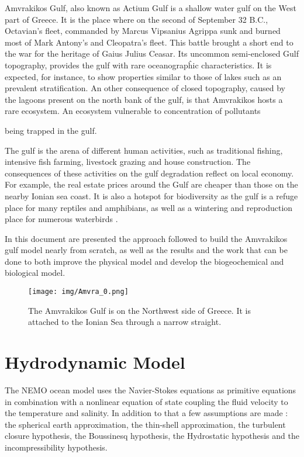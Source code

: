 \documentclass[english]{PFeENSTA}
\begin{document}
Amvrakikos Gulf, also known as Actium Gulf is a shallow water gulf on the West part of Greece. It is the place where on the second of September 32 B.C., Octavian's fleet, commanded by Marcus Vipsanius Agrippa sunk and burned most of Mark Antony's and Cleopatra's fleet. This battle brought a short end to the war for the heritage of Gaius Julius Ceasar. Its uncommon semi-enclosed Gulf topography, provides the gulf with rare oceanograpĥic characteristics. It is expected, for instance, to show properties similar to those of lakes such as an prevalent stratification.  An other consequence of closed topography, caused by the lagoons present on the north bank of the gulf, is that Amvrakikos hosts a rare ecosystem. An ecosystem vulnerable to concentration of pollutants {being trapped in the gulf. 

The gulf is the arena of  different human activities, such as traditional fishing, intensive fish farming, livestock grazing and house construction. The consequences of these activities on the gulf degradation reflect on local economy. For example, the real estate prices around the Gulf are cheaper than those on the nearby Ionian sea coast. It is also a hotspot for biodiversity as the gulf is a refuge place for many reptiles and amphibians, as well as a wintering and reproduction place for numerous waterbirds \cite{RAMSAR}. 

In this document are presented the approach followed to build the Amvrakikos gulf model nearly from scratch, as well as the results and the work that can be done to both improve the physical model and develop the biogeochemical and biological model.


\begin{figure}[!h]
\centering
\texttt{[image: img/Amvra\_0.png]}
\caption{\label{fig:MAP_AMVRA}The Amvrakikos Gulf is on the Northwest side of Greece. It is attached to the Ionian Sea through a narrow straight. }
\end{figure}





\chapter{Hydrodynamic Model}
The NEMO ocean model uses the Navier-Stokes equations as primitive equations in combination with a nonlinear equation of state coupling the fluid velocity to the temperature and salinity. In addition to that a few assumptions are made : the spherical earth approximation, the thin-shell approximation, the turbulent closure hypothesis, the Boussinesq hypothesis, the Hydrostatic hypothesis and the incompressibility hypothesis. 

}
\end{document}
